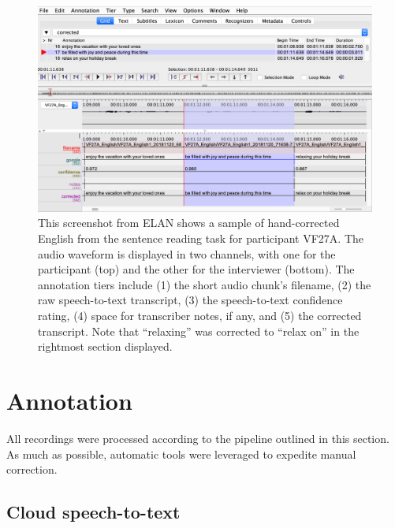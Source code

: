 \begin{figure}[ht]
\begin{center}
\includegraphics[width=4.9in]{figures/ch2_elan.png} 
\caption{This screenshot from ELAN shows a sample of hand-corrected English from the sentence reading task for participant VF27A. The audio waveform is displayed in two channels, with one for the participant (top) and the other for the interviewer (bottom). The annotation tiers include (1) the short audio chunk's filename, (2) the raw speech-to-text transcript, (3) the speech-to-text confidence rating, (4) space for transcriber notes, if any, and (5) the corrected transcript. Note that ``relaxing'' was corrected to ``relax on'' in the rightmost section displayed.}
\label{ch2:fig:elan}
\end{center}
\end{figure}

\section{Annotation}\label{ch2:sec:annotation}
All recordings were processed according to the pipeline outlined in this section. As much as possible, automatic tools were leveraged to expedite manual correction. 

\subsection{Cloud speech-to-text}\label{ch2:subsec:stt}

